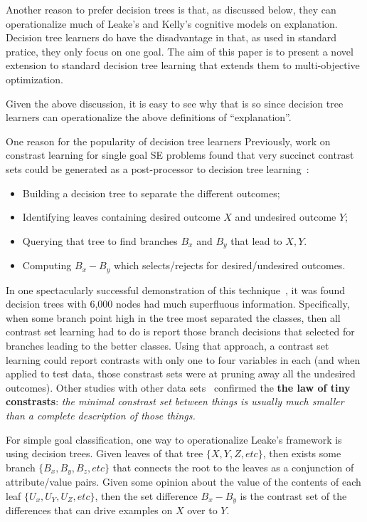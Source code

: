 \documentclass[runningheads]{llncs}
\newcommand{\bi}{\begin{itemize}}
\newcommand{\ei}{\end{itemize}}
\begin{document}
Another reason to prefer decision trees is that, as discussed below, they
can operationalize much of Leake's and Kelly's
cognitive models on explanation.  Decision tree learners do have the disadvantage in that,
as used in standard pratice, they only focus on one goal. The aim of this
paper is to present a novel extension to standard decision tree learning that
extends them  to multi-objective optimization.

Given the above discussion, it is easy to see why that is so since decision
tree learners can operationalize the above definitions of ``explanation''.

One reason for the popularity of decision tree learners 
Previously, work on
constrast learning for single goal SE problems
found that very succinct contrast sets could be generated as a post-processor
to decision tree learning~\cite{me00e}:
\bi
\item Building a decision tree to separate the different outcomes;
\item Identifying leaves containing desired outcome $X$ and undesired outcome $Y$;
\item Querying that tree to find branches $B_x$ and $B_y$ that lead to
$X,Y$.
\item Computing  $B_x - B_y$ which   selects/rejects for
desired/undesired outcomes.
\ei
In one spectacularly successful demonstration of this technique~\cite{me03c}, it was found decision trees with 6,000 nodes had much
superfluous information.
Specifically, when 
some branch point high in the tree
most separated  the classes, then all contrast
set learning had to do is report those branch decisions that selected
for branches leading to the better classes.
Using that approach, a contrast set learning
could report 
contrasts   with only one to four variables in each (and when
applied to test data, those constrast sets were
at pruning away all the undesired outcomes). Other studies
with other data sets~\cite{me07} 
confirmed the {\bf
the law of tiny constrasts}:  {\em 
the minimal constrast set between things is usually much smaller
than a complete description of those things.}


For simple goal classification, one way to operationalize Leake's
framework is using decision trees. Given leaves of that tree $\{X,Y,Z,etc\}$, 
then exists some branch $\{B_x,B_y,B_z,etc\}$ that connects the root to the leaves
as a conjunction of attribute/value pairs.
Given some
opinion about the value of the contents of each leaf $\{U_x,U_Y,U_Z, etc\}$,  
then the set difference $B_x - B_y$ is the contrast set of the differences
that can drive examples on $X$ over to $Y$.
\end{document}
